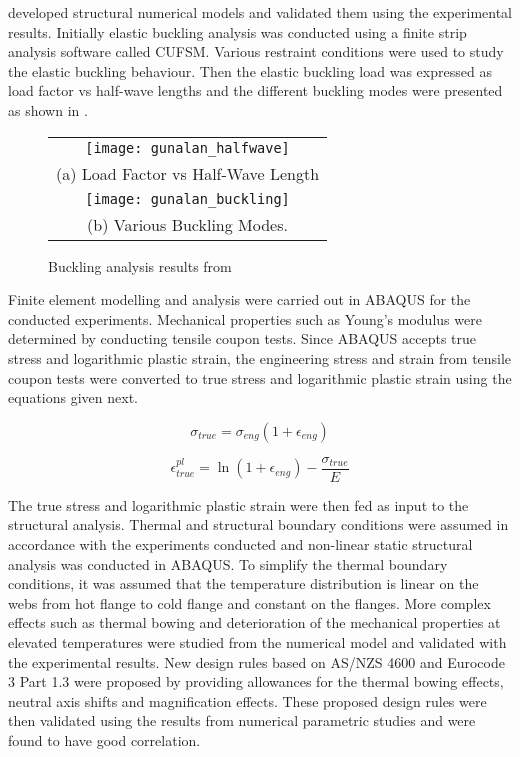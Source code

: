  developed structural numerical models and validated them using the experimental results. Initially elastic buckling analysis was conducted using a finite strip analysis software called CUFSM. Various restraint conditions were used to study the elastic buckling behaviour. Then the elastic buckling load was expressed as load factor vs half-wave lengths and the different buckling modes were presented as shown in .
\begin{figure}[htbp]
	\centering
		\begin{tabular}{c}
			\texttt{[image: gunalan\_halfwave]} \\ 
			(a)	Load Factor vs Half-Wave Length\\ 
			\texttt{[image: gunalan\_buckling]} \\ 
			(b)	Various Buckling Modes. \\ 
		\end{tabular} 
		\caption{Buckling analysis results from \citet{Gunalan2013f}}
		\label{fig:gunalan_buckling}
\end{figure}

Finite element modelling and analysis were carried out in ABAQUS for the conducted experiments. Mechanical properties such as Young’s modulus were determined by conducting tensile coupon tests. Since ABAQUS accepts true stress and logarithmic plastic strain, the engineering stress and strain from tensile coupon tests were converted to true stress and logarithmic plastic strain using the equations given next.

\begin{equation}
\sigma_{true} = \sigma_{eng}(1+\epsilon_{eng})
\end{equation}

\begin{equation}
\epsilon_{true}^{pl} = \ln(1+\epsilon_{eng})-\dfrac{\sigma_{true}}{E}
\end{equation}

The true stress and logarithmic plastic strain were then fed as input to the structural analysis. Thermal and structural boundary conditions were assumed in accordance with the experiments conducted and non-linear static structural analysis was conducted in ABAQUS. To simplify the thermal boundary conditions, it was assumed that the temperature distribution is linear on the webs from hot flange to cold flange and constant on the flanges. More complex effects such as thermal bowing and deterioration of the mechanical properties at elevated temperatures were studied from the numerical model and validated with the experimental results. New design rules based on AS/NZS 4600 and Eurocode 3 Part 1.3 were proposed by providing allowances for the thermal bowing effects, neutral axis shifts and magnification effects. These proposed design rules were then validated using the results from numerical parametric studies and were found to have good correlation.

